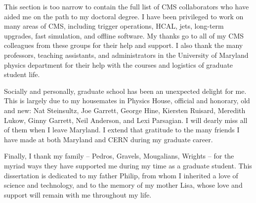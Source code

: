 This section is too narrow to contain the full list of CMS collaborators who have aided me on the path to my doctoral degree. I have been privileged to work on many areas of CMS, including trigger operations, HCAL, jets, long-term upgrades, fast simulation, and offline software. My thanks go to all of my CMS colleagues from these groups for their help and support. I also thank the many professors, teaching assistants, and administrators in the University of Maryland physics department for their help with the courses and logistics of graduate student life.

Socially and personally, graduate school has been an unexpected delight for me. This is largely due to my housemates in Physics House, official and honorary, old and new: Nat Steinsultz, Joe Garrett, George Hine, Kiersten Ruisard, Meredith Lukow, Ginny Garrett, Neil Anderson, and Lexi Parsagian. I will dearly miss all of them when I leave Maryland. I extend that gratitude to the many friends I have made at both Maryland and CERN during my graduate career.

Finally, I thank my family -- Pedros, Gravels, Mougalians, Wrights -- for the myriad ways they have supported me during my time as a graduate student. This dissertation is dedicated to my father Philip, from whom I inherited a love of science and technology, and to the memory of my mother Lisa, whose love and support will remain with me throughout my life.